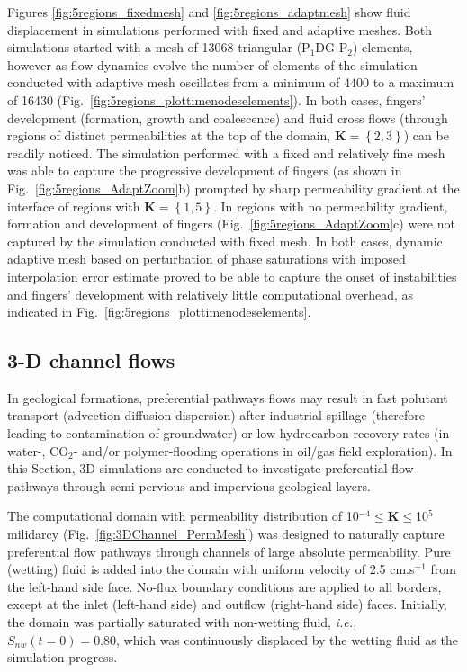 \documentclass[preprint,authoryear,12pt]{elsarticle}
\newcommand{\PN}[2][error]{P$_{#1}$DG-P$_{#2}$}
\newcommand{\ie}{{\it i.e., }}
\begin{document}
\medskip
Figures \ref{fig:5regions_fixedmesh} and \ref{fig:5regions_adaptmesh} show fluid displacement in simulations performed with fixed and adaptive meshes. Both simulations started with a mesh of 13068 triangular (\PN[1]{2}) elements, however as flow dynamics evolve the number of elements of the simulation conducted with adaptive mesh oscillates from a minimum of 4400 to a maximum of 16430 (Fig.~\ref{fig:5regions_plottimenodeselements}). In both cases, fingers' development (formation, growth and coalescence) and fluid cross flows (through regions of distinct permeabilities at the top of the domain, $\mathbf{K}=\left\{2,3\right\}$) can be readily noticed. The simulation performed with a fixed and relatively fine mesh was able to capture the progressive development of fingers (as shown in Fig.~\ref{fig:5regions_AdaptZoom}b) prompted by sharp permeability gradient at the interface of regions with $\mathbf{K}=\left\{1,5\right\}$. In regions with no permeability gradient, formation and development of fingers (Fig.~\ref{fig:5regions_AdaptZoom}c) were not captured by the simulation conducted with fixed mesh. In both cases, dynamic adaptive mesh based on perturbation of phase saturations with imposed interpolation error estimate proved to be able to capture the onset of instabilities and fingers' development with relatively little computational overhead, as indicated in Fig.~\ref{fig:5regions_plottimenodeselements}.   

\subsection{3-D channel flows} \label{section:results_3D} 
In geological formations, preferential pathways flows may result in fast polutant transport (advection-diffusion-dispersion) after industrial spillage (therefore leading to contamination of groundwater) or low hydrocarbon recovery rates (in water-, CO$_{2}$- and/or polymer-flooding operations in oil/gas field exploration). In this Section, 3D simulations are conducted to investigate preferential flow pathways through semi-pervious and impervious geological layers. 


The computational domain with permeability distribution of 10$^{-4}\le\mathbf{K}\le$10$^{5}$  milidarcy (Fig.~\ref{fig:3DChannel_PermMesh})  was designed to naturally capture preferential flow pathways through channels of large absolute permeability. Pure (wetting) fluid is added into the domain with uniform velocity of 2.5 cm.s$^{-1}$ from the left-hand side face. No-flux boundary conditions are applied to all borders, except at the inlet (left-hand side) and outflow (right-hand side) faces. Initially, the domain was partially saturated with non-wetting fluid, \ie $S_{nw}(t=0)=0.80$, which was continuously displaced by the wetting fluid as the simulation progress.
\end{document}
